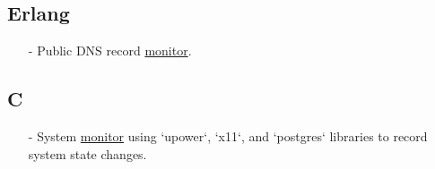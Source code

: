 \documentclass[11pt]{article}
\newcommand{\git}[2]{\href {https://github.com/azimut/{#2}} {#1}}
\begin{document}
\subsection{Erlang}
\begin{itemize}
  \setlength{\parskip}{0pt}
  \setlength{\itemsep}{0pt plus 1pt}
\item[-] Public DNS record {\git{monitor}{snitch}}.
\end{itemize}

\subsection{C}
\begin{itemize}
  \setlength{\parskip}{0pt}
  \setlength{\itemsep}{0pt plus 1pt}
\item[-] System {\git{monitor}{sleeper}} using `upower`, `x11`, and `postgres` libraries to record system state changes.
\end{itemize}
\end{document}
